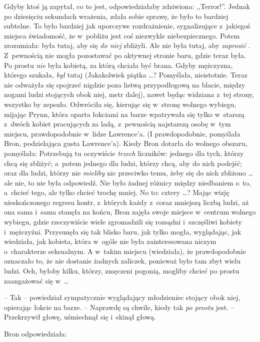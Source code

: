 \documentclass[oneside,polish,11pt,rmheadings]{mwbk}
\begin{document}
Gdyby ktoś ją zapytał, co to jest, odpowiedziałaby zdziwiona: ,,Terror!''. Jednak po dziesięciu sekundach wrażenia, zdała sobie sprawę, że było to bardziej subtelne. To było bardziej jak uporczywe rozdrażnienie, sygnalizujące z~jakiegoś miejsca świadomość, że w~pobliżu jest coś niezwykle niebezpiecznego. Potem zrozumiała: była tutaj, aby się \textit{do niej }zbliżyli. Ale nie była tutaj, aby \textit{zaprosić }. Z~pewnością nie mogła pozostawać po aktywnej stronie baru, gdzie teraz była. Po prostu \textit{nie }była  kobietą, za którą chciała być brana. Gdyby mężczyzna, którego szukała, \textit{był }tutaj (Jakakolwiek piątka \ldots ? Pomyślała, nieistotnie. Teraz nie odważyła się spojrzeć nigdzie poza listwą przypodłogową na blacie, między nogami ludzi stojących obok niej, metr dalej), nawet będąc widziana z~tej strony, wszystko by zepsuło. Odwróciła się, kierując się w~stronę wolnego wybiegu, mijając Prynn, która oparta łokciami na barze wpatrywała się tylko w~starszą z~dwóch kobiet pracujących za ladą, z~pewnością najstarszą osobę w~tym miejscu, prawdopodobnie w~lidze Lawrence'a. (I prawdopodobnie, pomyślała Bron, podzielająca gusta Lawrence'a). Kiedy Bron dotarła do wolnego obszaru, pomyślała: Potrzebują tu oczywiście \textit{trzech }liczników: jednego dla tych, którzy chcą się zbliżyć; a~potem jednego dla ludzi, którzy chcą, aby do nich podejść; oraz dla ludzi, którzy nie \textit{mieliby }nic przeciwko temu, żeby się do nich zbliżono \ldots  ale nie, to nie była odpowiedź. Nie było żadnej różnicy między niedbaniem o~to, a~chcieć tego, ale tylko chcieć trochę mniej. No to: cztery \ldots  ? Mając wizję nieskończonego regresu kontr, z~których każdy z~coraz mniejszą liczbą ludzi, aż ona sama i~sama stanęła na końcu, Bron zajęła swoje miejsce w~centrum wolnego wybiegu, gdzie rzeczywiście wiele zgromadzili się rozsądni i~szczęśliwi kobiety i~mężczyźni. Przysunęła się tak blisko baru, jak tylko mogła, wyglądając, jak wiedziała, jak kobieta, która w~ogóle nie była zainteresowana niczym o~charakterze seksualnym. A w~takim miejscu (wiedziała), że prawdopodobnie oznaczało to, że nie dostanie żadnych zaliczek, ponieważ było tam zbyt wielu ludzi. Och, byłoby kilku, którzy, zmęczeni pogonią, mogliby chcieć po prostu zaangażować się w~\ldots  

-- Tak -- powiedział sympatycznie wyglądający młodzieniec stojący obok niej, opierając łokcie na barze. -- Naprawdę są chwile, kiedy tak \textit{po prostu }jest. --  Przekrzywił głowę, uśmiechnął się i~skinął głową. 

Bron odpowiedziała: 
\end{document}

